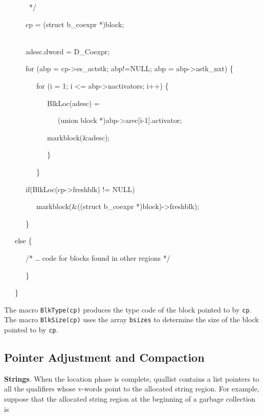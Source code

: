 {\ttfamily\mdseries
\ \ \ \ \ \ \ */
}

{\ttfamily\mdseries
\ \ \ \ \ \ cp = (struct b\_coexpr *)block;
\ \ \ \ \ \ \ \ \ \ \ \ \ \ \ \ \ \ \ \ \ \ \ \ \ \ \ \ \ \ \ \ \ \ \ \ \ \ \ \ \ \ \ }

{\ttfamily\mdseries
\ \ \ \ \ \ adesc.dword = D\_Coexpr;
}

{\ttfamily\mdseries
\ \ \ \ \ \ for (abp = cp-{\textgreater}es\_actstk; abp!=NULL; abp = abp-{\textgreater}astk\_nxt) \{
}

{\ttfamily\mdseries
\ \ \ \ \ \ \ \ \ for (i = 1; i {\textless}= abp-{\textgreater}nactivators; i++) \{
}

{\ttfamily\mdseries
\ \ \ \ \ \ \ \ \ \ \ \ BlkLoc(adesc) =}

{\ttfamily\mdseries
\ \ \ \ \ \ \ \ \ \ \ \ \ \ \ (union block *)abp-{\textgreater}arec[i-1].activator;}

{\ttfamily\mdseries
\ \ \ \ \ \ \ \ \ \ \ \ markblock(\&adesc);
}

{\ttfamily\mdseries
\ \ \ \ \ \ \ \ \ \ \ \ \}
}

{\ttfamily\mdseries
\ \ \ \ \ \ \ \ \ \}
}

{\ttfamily\mdseries
\ \ \ \ \ \ if(BlkLoc(cp-{\textgreater}freshblk) != NULL)
}

{\ttfamily\mdseries
\ \ \ \ \ \ \ \ \ markblock(\&((struct b\_coexpr *)block)-{\textgreater}freshblk);
}

{\ttfamily\mdseries
\ \ \ \ \ \ \}}

{\ttfamily\mdseries
\ \ \ else \{}

{\ttfamily\mdseries
\ \ \ \ \ \ /* {\dots} code for blocks found in other regions */}

{\ttfamily\mdseries
\ \ \ \ \ \ \}}

{\ttfamily\mdseries
\ \ \ \}}


The macro \texttt{BlkType(cp)} produces the type code of the block
pointed to by \texttt{cp}. The macro \texttt{BlkSize(cp)} uses the
array \texttt{bsizes} to determine the size of the block pointed to by
\texttt{cp}.

\subsection{Pointer Adjustment and Compaction}

\textbf{Strings}. When the location phase is complete, quallist
contains a list pointers to all the qualifiers whose v-words point to
the allocated string region. For example, suppose that the allocated
string region at the beginning of a garbage collection is

